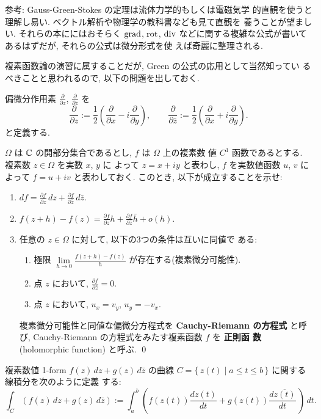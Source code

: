 \documentclass[12pt,twoside]{jarticle}
\def\C{{\Bbb C}} %
\def\pd#1#2{\frac{\partial #1}{\partial #2}}
\def\grad{\mathop{\text{\rm grad}}\nolimits}
\def\rot{\mathop{\text{\rm rot}}\nolimits}
\def\div{\mathop{\text{\rm div}}\nolimits}
\begin{document}
\noindent 参考: Gauss-Green-Stokes の定理は流体力学的もしくは電磁気学
的直観を使うと理解し易い. ベクトル解析や物理学の教科書なども見て直観を
養うことが望ましい. それらの本ににはおそらく $\grad$, $\rot$, $\div$ 
などに関する複雑な公式が書いてあるはずだが, それらの公式は微分形式を使
えば奇麗に整理される.

複素函数論の演習に属することだが, Green の公式の応用として当然知ってい
るべきことと思われるので, 以下の問題を出しておく.

偏微分作用素 $\pd{}{z}$, $\pd{}{\bar z}$ を
\[
  \pd{}{z}      := \frac{1}{2}\left( \pd{}{x} - i \pd{}{y} \right),
  \qquad
  \pd{}{\bar z} := \frac{1}{2}\left( \pd{}{x} + i \pd{}{y} \right).
\]
と定義する.

\begin{question}
  $\Omega$ は $\C$ の開部分集合であるとし, $f$ は $\Omega$ 上の複素数
  値 $C^1$ 函数であるとする. 複素数 $z \in \Omega$ を実数 $x$, $y$ に
  よって $z = x + iy$ と表わし, $f$ を実数値函数 $u$, $v$ によって %
  $f = u + iv$ と表わしておく. このとき, 以下が成立することを示せ: %
  \begin{enumerate}
  \item 
    \( \displaystyle
      df
      = \pd{f}{z}\,dz + \pd{f}{\bar z}\,d\bar{z}.
    \)
  \item 
    \( \displaystyle
      f(z + h) - f(z) = \pd{f}{z} h + \pd{f}{\bar z} \bar{h} + o(h).
    \)
  \item 任意の $z \in \Omega$ に対して, 以下の3つの条件は互いに同値で
    ある:
    \begin{enumerate}
    \item 極限 %
      \(%
        \displaystyle \lim\limits_{h\to 0} \frac{f(z+h) - f(z)}{h}
      \)%
      が存在する(複素微分可能性).
    \item 点 $z$ において, $\displaystyle \pd{f}{\bar z} = 0$.
    \item 点 $z$ において, $u_x = v_y$, $u_y = - v_x$.
    \end{enumerate}
    複素微分可能性と同値な偏微分方程式を {\bf Cauchy-Riemann の方程式} 
    と呼び, Cauchy-Riemann の方程式をみたす複素函数 $f$ を {\bf 正則函
      数} (holomorphic function) と呼ぶ.
    \qed
  \end{enumerate}
\end{question}

複素数値 1-form $f(z)\,dz + g(z)\,d{\bar z}$ の曲線 %
$C = \{\, z(t) \mid a\le t \le b \,\}$ に関する線積分を次のように定義
する:
\[
  \int_C (f(z)\,dz + g(z)\,d{\bar z})
  :=
  \int_a^b \left(
    f(z(t)) \frac{dz(t)}{dt} + g(z(t)) \frac{d\overline{z(t)}}{dt}\,
  \right) \,dt.
\]
\end{document}

